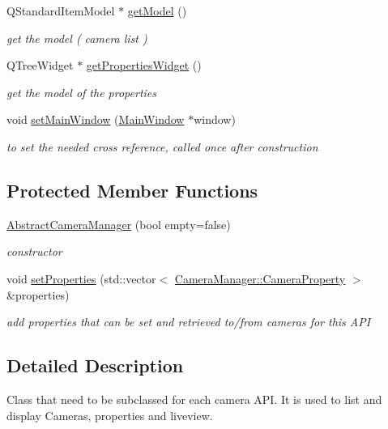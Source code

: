 \begin{DoxyCompactItemize}
\item 
Q\-Standard\-Item\-Model $\ast$ \hyperlink{class_abstract_camera_manager_a02097102061955f0092969a6cf812823}{get\-Model} ()
\begin{DoxyCompactList}\small\item\em get the model ( camera list ) \end{DoxyCompactList}\item 
Q\-Tree\-Widget $\ast$ \hyperlink{class_abstract_camera_manager_a8cfcc9f2156936f1d8faea55ad97eeab}{get\-Properties\-Widget} ()
\begin{DoxyCompactList}\small\item\em get the model of the properties \end{DoxyCompactList}\item 
void \hyperlink{class_abstract_camera_manager_a9369df77518a91e24596d2bbe3436bab}{set\-Main\-Window} (\hyperlink{class_main_window}{Main\-Window} $\ast$window)
\begin{DoxyCompactList}\small\item\em to set the needed cross reference, called once after construction \end{DoxyCompactList}\end{DoxyCompactItemize}
\subsection*{Protected Member Functions}
\begin{DoxyCompactItemize}
\item 
\hyperlink{class_abstract_camera_manager_a23be9d93959d992c91efcf1416c597ef}{Abstract\-Camera\-Manager} (bool empty=false)
\begin{DoxyCompactList}\small\item\em constructor \end{DoxyCompactList}\item 
void \hyperlink{class_abstract_camera_manager_ac5c7ff3b69138df82efafa0400b50ce5}{set\-Properties} (std\-::vector$<$ \hyperlink{class_camera_manager_1_1_camera_property}{Camera\-Manager\-::\-Camera\-Property} $>$ \&properties)
\begin{DoxyCompactList}\small\item\em add properties that can be set and retrieved to/from cameras for this A\-P\-I \end{DoxyCompactList}\end{DoxyCompactItemize}


\subsection{Detailed Description}
Class that need to be subclassed for each camera A\-P\-I. It is used to list and display Cameras, properties and liveview. 

